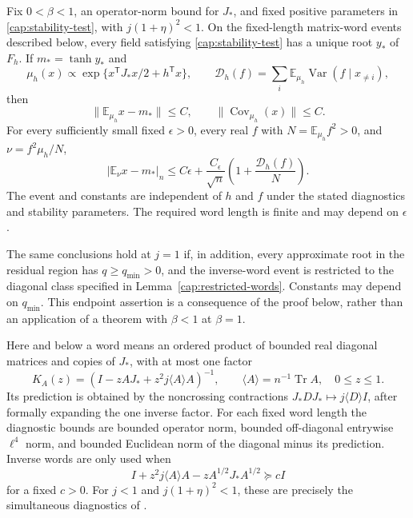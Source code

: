 \begin{proposition}\label{cap:classical-input}
Fix $0<\beta<1$, an operator-norm bound for $J_*$, and fixed positive
parameters in \eqref{cap:stability-test}, with
$j(1+\eta)^2<1$.  On the fixed-length matrix-word events described below,
every field satisfying \eqref{cap:stability-test} has a unique root $y_*$
of $F_h$.  If $m_* =\tanh y_*$ and
\[
 \mu_h(x)\propto\exp\{x^{\mathsf T}J_*x/2+h^{\mathsf T}x\},
 \qquad
 \mathcal D_h(f)=\sum_i\mathbb E_{\mu_h}
                 \operatorname{Var}(f\mid x_{\ne i}),
\]
then
\begin{equation}\label{cap:classical-mean-covariance}
 \|\mathbb E_{\mu_h}x-m_*\|\le C,
 \qquad \|\operatorname{Cov}_{\mu_h}(x)\|\le C.
\end{equation}
For every sufficiently small fixed $\epsilon>0$, every real $f$ with
$N=\mathbb E_{\mu_h}f^2>0$, and $\nu=f^2\mu_h/N$,
\begin{equation}\label{cap:square-reweighting}
 |\mathbb E_\nu x-m_*|_n
 \le C\epsilon+\frac{C_\epsilon}{\sqrt n}
                    \left(1+\frac{\mathcal D_h(f)}{N}\right).
\end{equation}
The event and constants are independent of $h$ and $f$ under the stated
diagnostics and stability parameters.  The required word length is finite
and may depend on $\epsilon$.

The same conclusions hold at $j=1$ if, in addition, every approximate root
in the residual region has $q\ge q_{\min}>0$, and the inverse-word event
is restricted to the diagonal class specified in
Lemma~\ref{cap:restricted-words}.  Constants may depend on $q_{\min}$.
This endpoint assertion is a consequence of the proof below, rather than
an application of a theorem with $\beta<1$ at $\beta=1$.
\end{proposition}

Here and below a word means an ordered product of bounded real diagonal
matrices and copies of $J_*$, with at most one factor
\[
 K_A(z)=\left(I-zAJ_*+z^2j\langle A\rangle A\right)^{-1},
 \qquad \langle A\rangle=n^{-1}\operatorname{Tr}A,
 \quad 0\le z\le1.
\]
Its prediction is obtained by the noncrossing contractions $J_*DJ_*\mapsto
j\langle D\rangle I$, after formally expanding the one inverse factor. For
each fixed word length the diagnostic bounds are bounded operator norm,
bounded off-diagonal entrywise $\ell^4$ norm, and bounded Euclidean norm of
the diagonal minus its prediction. Inverse words are only used when
\[
 I+z^2j\langle A\rangle A-zA^{1/2}J_*A^{1/2}\succeq cI
\]
for a fixed $c>0$.  For $j<1$ and $j(1+\eta)^2<1$, these are precisely
the simultaneous diagnostics of \cite[Lemma~3.1]{AcceptedGap}.

